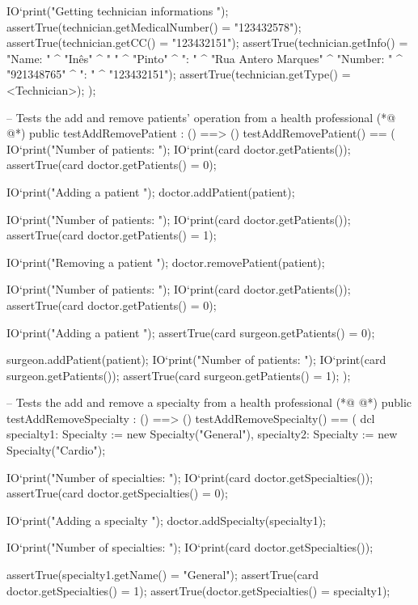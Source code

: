 \begin{vdmpp}[breaklines=true]
   IO`print("\n Getting technician informations \n");
   assertTrue(technician.getMedicalNumber() = "123432578");
   assertTrue(technician.getCC() = "123432151");
   assertTrue(technician.getInfo() = "Name: " ^ "Inês" ^ " " ^ "Pinto" ^ "\nAddress: " ^ "Rua Antero Marques" ^ "\nPhone Number: " ^ "921348765" ^ "\nCC: " ^ "123432151");
   assertTrue(technician.getType() = <Technician>);
  );
 
 -- Tests the add and remove patients' operation from a health professional
(*@
\label{testAddRemovePatient:47}
@*)
 public testAddRemovePatient : () ==> ()
  testAddRemovePatient() == (
   IO`print("\n Number of patients: ");
   IO`print(card doctor.getPatients());
   assertTrue(card doctor.getPatients() = 0);
   
   IO`print("\n Adding a patient \n");
   doctor.addPatient(patient);
   
   IO`print("\n Number of patients: ");
   IO`print(card doctor.getPatients());
   assertTrue(card doctor.getPatients() = 1);
   
   IO`print("\n Removing a patient \n");
   doctor.removePatient(patient);
   
   IO`print("\n Number of patients: ");
   IO`print(card doctor.getPatients());
   assertTrue(card doctor.getPatients() = 0);
   
   IO`print("\n Adding a patient \n");
   assertTrue(card surgeon.getPatients() = 0);
   
   surgeon.addPatient(patient);
   IO`print("\n Number of patients: ");
   IO`print(card surgeon.getPatients());
   assertTrue(card surgeon.getPatients() = 1);
  );
 
 -- Tests the add and remove a specialty from a health professional
(*@
\label{testAddRemoveSpecialty:77}
@*)
 public testAddRemoveSpecialty : () ==> ()
  testAddRemoveSpecialty() == (
   dcl specialty1: Specialty := new Specialty("General"), specialty2: Specialty := new Specialty("Cardio");
   
   IO`print("\n Number of specialties: ");
   IO`print(card doctor.getSpecialties());
   assertTrue(card doctor.getSpecialties() = 0);
   
   IO`print("\n Adding a specialty \n");
   doctor.addSpecialty(specialty1);
   
   IO`print("\n Number of specialties: ");
   IO`print(card doctor.getSpecialties());
   
   assertTrue(specialty1.getName() = "General");
   assertTrue(card doctor.getSpecialties() = 1);
   assertTrue(doctor.getSpecialties() = {specialty1});
   

\end{vdmpp}
